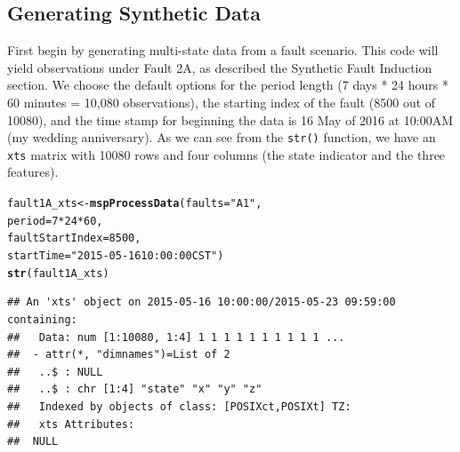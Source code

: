 \documentclass{report}\usepackage[]{graphicx}\usepackage[]{color}
\makeatletter
\newcommand{\hlnum}[1]{\textcolor[rgb]{0.686,0.059,0.569}{#1}}%
\newcommand{\hlstr}[1]{\textcolor[rgb]{0.192,0.494,0.8}{#1}}%
\newcommand{\hlopt}[1]{\textcolor[rgb]{0,0,0}{#1}}%
\newcommand{\hlstd}[1]{\textcolor[rgb]{0.345,0.345,0.345}{#1}}%
\newcommand{\hlkwb}[1]{\textcolor[rgb]{0.69,0.353,0.396}{#1}}%
\newcommand{\hlkwc}[1]{\textcolor[rgb]{0.333,0.667,0.333}{#1}}%
\newcommand{\hlkwd}[1]{\textcolor[rgb]{0.737,0.353,0.396}{\textbf{#1}}}%
\newenvironment{kframe}{%
 \def\at@end@of@kframe{}%
 \ifinner\ifhmode%
  \def\at@end@of@kframe{\end{minipage}}%
  \begin{minipage}{\columnwidth}%
 \fi\fi%
 \def\FrameCommand##1{\hskip\@totalleftmargin \hskip-\fboxsep
 \colorbox{shadecolor}{##1}\hskip-\fboxsep
     \hskip-\linewidth \hskip-\@totalleftmargin \hskip\columnwidth}%
 \MakeFramed {\advance\hsize-\width
   \@totalleftmargin\z@ \linewidth\hsize
   \@setminipage}}%
 {\par\unskip\endMakeFramed%
 \at@end@of@kframe}
\newenvironment{knitrout}{}{} %
\makeatother
\begin{document}
\subsection{Generating Synthetic Data}
First begin by generating multi-state data from a fault scenario. This code will yield observations under Fault 2A, as described the Synthetic Fault Induction section. We choose the default options for the period length (7 days * 24 hours * 60 minutes = 10,080 observations), the starting index of the fault (8500 out of 10080), and the time stamp for beginning the data is 16 May of 2016 at 10:00AM (my wedding anniversary). As we can see from the \texttt{str()} function, we have an \texttt{xts} matrix with 10080 rows and four columns (the state indicator and the three features).

\begin{knitrout}
\color{fgcolor}\begin{kframe}
\begin{alltt}
\hlstd{fault1A_xts} \hlkwb{<-} \hlkwd{mspProcessData}\hlstd{(}\hlkwc{faults} \hlstd{=} \hlstr{"A1"}\hlstd{,}
                              \hlkwc{period} \hlstd{=} \hlnum{7} \hlopt{*} \hlnum{24} \hlopt{*} \hlnum{60}\hlstd{,}
                              \hlkwc{faultStartIndex} \hlstd{=} \hlnum{8500}\hlstd{,}
                              \hlkwc{startTime} \hlstd{=} \hlstr{"2015-05-16 10:00:00 CST"}\hlstd{)}
\hlkwd{str}\hlstd{(fault1A_xts)}
\end{alltt}
\begin{verbatim}
## An 'xts' object on 2015-05-16 10:00:00/2015-05-23 09:59:00 containing:
##   Data: num [1:10080, 1:4] 1 1 1 1 1 1 1 1 1 1 ...
##  - attr(*, "dimnames")=List of 2
##   ..$ : NULL
##   ..$ : chr [1:4] "state" "x" "y" "z"
##   Indexed by objects of class: [POSIXct,POSIXt] TZ:
##   xts Attributes:
##  NULL
\end{verbatim}
\end{kframe}
\end{knitrout}
\end{document}
